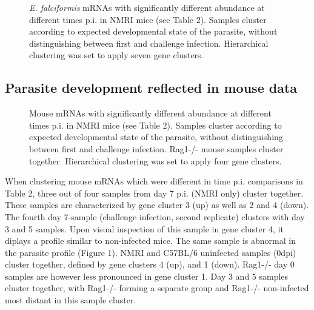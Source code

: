 \documentclass{bmcart}
\begin{document}
\begin{backmatter}
\begin{figure}[h!]
	\caption{\textit{E. falciformis} mRNAs with significantly
          different abundance at different times p.i. in NMRI mice
          (see Table 2). Samples cluster according to expected
          developmental state of the parasite, without distinguishing
          between first and challenge infection. Hierarchical
          clustering was set to apply seven gene clusters.}
\end{figure}


\subsection{Parasite development reflected in mouse data}
\begin{figure}[h!]
\caption{Mouse mRNAs with significantly different abundance at
  different times p.i. in NMRI mice (see Table 2). Samples cluster
  according to expected developmental state of the parasite, without
  distinguishing between first and challenge infection. Rag1-/- mouse
  samples cluster together. Hierarchical clustering was set to apply
  four gene clusters.}
\end{figure}

When clustering mouse mRNAs which were different in time
p.i. comparisons in Table 2, three out of four samples from day 7
p.i. (NMRI only) cluster together. These samples are characterized by
gene cluster 3 (up) as well as 2 and 4 (down). The fourth day 7-sample
(challenge infection, second replicate) clusters with day 3 and 5
samples. Upon visual inspection of this sample in gene cluster 4, it
diplays a profile similar to non-infected mice. The same sample is
abnormal in the parasite profile (Figure 1). NMRI and C57BL/6
uninfected samples (0dpi) cluster together, defined by gene clusters 4
(up), and 1 (down). Rag1-/- day 0 samples are however less pronounced
in gene cluster 1. Day 3 and 5 samples cluster together, with Rag1-/-
forming a separate group and Rag1-/- non-infected most distant in this
sample cluster.




\end{backmatter}
\end{document}
